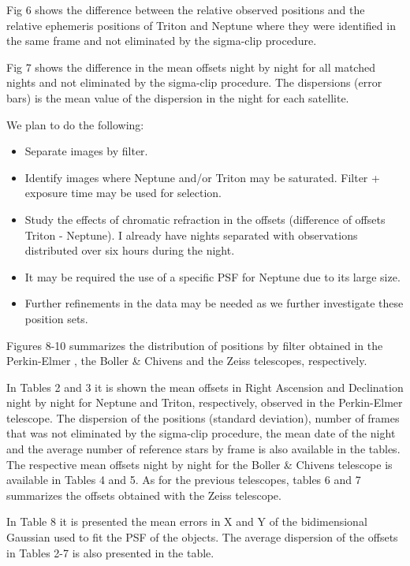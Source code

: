\documentclass[12pt,a4paper]{report}
\newcommand{\PE}{Perkin-Elmer }
\newcommand{\BC}{Boller \& Chivens }
\begin{document}
Fig 6 shows the difference between the relative observed positions and the relative ephemeris positions of Triton and Neptune where they were identified in the same frame and not eliminated by the sigma-clip procedure.

Fig 7 shows the difference in the mean offsets night by night for all matched nights and not eliminated by the sigma-clip procedure. The dispersions (error bars) is the mean value of the dispersion in the night for each satellite.



We plan to do the following:
\begin{itemize}
\item Separate images by filter.
\item Identify images where Neptune and/or Triton may be saturated. Filter + exposure time may be used for selection.
\item Study the effects of chromatic refraction in the offsets (difference of offsets Triton - Neptune). I already have nights separated with observations distributed over six hours during the night.
\item It may be required the use of a specific PSF for Neptune due to its large size.
\item Further refinements in the data may be needed as we further investigate these position sets.
\end{itemize}

Figures 8-10 summarizes the distribution of positions by filter obtained in the \PE , the \BC and the Zeiss telescopes, respectively.

In Tables 2 and 3 it is shown the mean offsets in Right Ascension and Declination night by night for Neptune and Triton, respectively, observed in the \PE telescope. The dispersion of the positions (standard deviation), number of frames that was not eliminated by the sigma-clip procedure, the mean date of the night and the average number of reference stars by frame is also available in the tables. The respective mean offsets night by night for the \BC telescope is available in Tables 4 and 5. As for the previous telescopes, tables 6 and 7 summarizes the offsets obtained with the Zeiss telescope.

In Table 8 it is presented the mean errors in X and Y of the bidimensional Gaussian used to fit the PSF of the objects. The average dispersion of the offsets in Tables 2-7 is also presented in the table.
\end{document}
